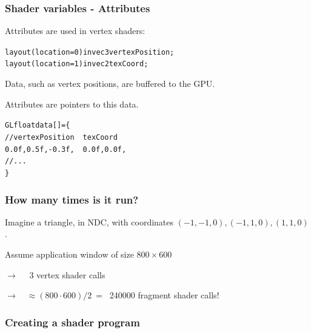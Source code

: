 \documentclass{beamer}
\begin{document}
%
%
%
\begin{frame}
\frametitle{Shader variables - Attributes}

Attributes are used in vertex shaders:

\begin{alltt}\footnotesize
layout (location = 0) in vec3 vertexPosition;\\
layout (location = 1) in vec2 texCoord;
\end{alltt}

Data, such as vertex positions, are buffered to the GPU.

Attributes are pointers to this data.

\begin{alltt}
GLfloat data[] = \{\\
    // vertexPosition \ensuremath{\quad} texCoord\\
    0.0f, 0.5f, -0.3f,\ensuremath{\quad}    0.0f, 0.0f,\\
    //  ...\\
\}
\end{alltt}

\end{frame}





%
%
%
\begin{frame}
\frametitle{How many times is it run?}

Imagine a triangle, in NDC, with coordinates $(-1,-1,0), (-1,1,0), (1,1,0)$.

Assume application window of size $800 \times 600$

$\rightarrow \quad$ 3 vertex shader calls

$\rightarrow \quad \approx (800\cdot 600) / 2\ =\ $ 240000 fragment shader calls!
\end{frame}


%
%
%
\begin{frame}
\frametitle{Creating a shader program}
\end{frame}
\end{document}
